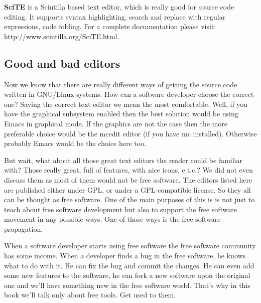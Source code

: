\textbf{SciTE} is a Scintilla based text editor, which is really good for source code editing. It supports syntax highlighting, search and replace with regular expressions, code folding. For a complete documentation please visit: http://www.scintilla.org/SciTE.html.

\subsection{Good and bad editors}
Now we know that there are really different ways of getting the source code written in GNU/Linux systems. How can a software developer choose the correct one? Saying the correct text editor we mean the most comfortable. Well, if you have the graphical subsystem enabled then the best solution would be using Emacs in graphical mode. If the graphics are not the case then the more preferable choice would be the mcedit editor (if you have mc installed). Otherwise probably Emacs would be the choice here too.

But wait, what about all those great text editors the reader could be familiar with? Those really great, full of features, with nice icons, e.t.c.? We did not even discuss them as most of them would not be free software. The editors listed here are published either under GPL, or under a GPL-compatible license. So they all can be thought as free software. One of the main purposes of this is is not just to teach about free software development but also to support the free software movement in any possible ways. One of those ways is the free software propagation.

When a software developer starts using free software the free software community has some income. When a developer finds a bug in the free software, he knows what to do with it. He can fix the bug and commit the changes. He can even add some new features to the software, he can fork a new software upon the original one and we'll have something new in the free software world. That's why in this book we'll talk only about free tools. Get used to them.
